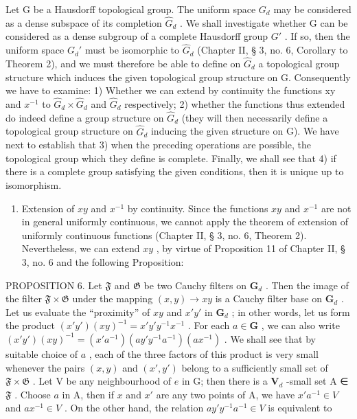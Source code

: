 Let G be a Hausdorff topological group. The uniform space \(G_{d}\) may be considered as a dense subspace of its completion \(\hat{G}_{d}\) . We shall investigate whether G can be considered as a dense subgroup of a complete Hausdorff group \(G'\) . If so, then the uniform space \(G_{d}'\) must be isomorphic to \(\hat{G}_{d}\) (Chapter II, § 3, no. 6, Corollary to Theorem 2), and we must therefore be able to define on \(\hat{G}_{d}\) a topological group structure which induces the given topological group structure on G. Consequently we have to examine: 1) Whether we can extend by continuity the functions xy and \(x^{-1}\) to \(\hat{G}_{d} \times \hat{G}_{d}\) and \(\hat{G}_{d}\) respectively; 2) whether the functions thus extended do indeed define a group structure on \(\hat{G}_{d}\) (they will then necessarily define a topological group structure on \(\hat{G}_{d}\) inducing the given structure on G). We have next to establish that 3) when the preceding operations are possible, the topological group which they define is complete. Finally, we shall see that 4) if there is a complete group satisfying the given conditions, then it is unique up to isomorphism.

\begin{enumerate}
\def\labelenumi{\arabic{enumi})}
\tightlist
\item
  Extension of \(xy\) and \(x^{-1}\) by continuity. Since the functions \(xy\) and \(x^{-1}\) are not in general uniformly continuous, we cannot apply the theorem of extension of uniformly continuous functions (Chapter II, § 3, no. 6, Theorem 2). Nevertheless, we can extend \(xy\) , by virtue of Proposition 11 of Chapter II, § 3, no. 6 and the following Proposition:
\end{enumerate}

PROPOSITION 6. Let \(\mathfrak{F}\) and \(\mathfrak{G}\) be two Cauchy filters on \(\mathbf{G}_d\) . Then the image of the filter \(\mathfrak{F} \times \mathfrak{G}\) under the mapping \((x, y) \to xy\) is a Cauchy filter base on \(\mathbf{G}_d\) . Let us evaluate the ``proximity'' of \(xy\) and \(x'y'\) in \(\mathbf{G}_d\) ; in other words, let us form the product \((x'y')(xy)^{-1} = x'y'y^{-1}x^{-1}\) . For each \(a \in \mathbf{G}\) , we can also write \((x'y')(xy)^{-1} = (x'a^{-1})(ay'y^{-1}a^{-1})(ax^{-1})\) . We shall see that by suitable choice of \(a\) , each of the three factors of this product is very small whenever the pairs \((x, y)\) and \((x', y')\) belong to a sufficiently small set of \(\mathfrak{F} \times \mathfrak{G}\) . Let V be any neighbourhood of \(e\) in G; then there is a \(\mathbf{V}_d\) -small set A ∈ \(\mathfrak{F}\) . Choose \(a\) in A, then if \(x\) and \(x'\) are any two points of A, we have \(x'a^{-1} \in V\) and \(ax^{-1} \in V\) . On the other hand, the relation \(ay'y^{-1}a^{-1} \in V\) is equivalent to


